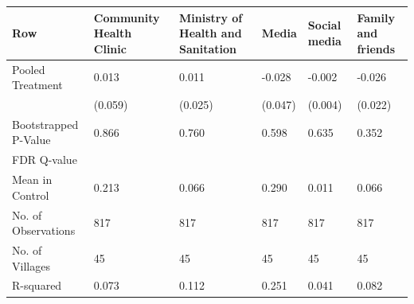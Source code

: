 
\begin{tabular}{llllll}
\toprule
Row & Community Health Clinic & Ministry of Health and Sanitation & Media & Social media & Family and friends\\
\midrule
Pooled Treatment & 0.013 & 0.011 & -0.028 & -0.002 & -0.026\\
 & (0.059) & (0.025) & (0.047) & (0.004) & (0.022)\\
Bootstrapped P-Value & 0.866 & 0.760 & 0.598 & 0.635 & 0.352\\
FDR Q-value &  &  &  &  & \\
Mean in Control & 0.213 & 0.066 & 0.290 & 0.011 & 0.066\\
\addlinespace
No. of Observations & 817 & 817 & 817 & 817 & 817\\
No. of Villages & 45 & 45 & 45 & 45 & 45\\
R-squared & 0.073 & 0.112 & 0.251 & 0.041 & 0.082\\
\bottomrule
\end{tabular}
